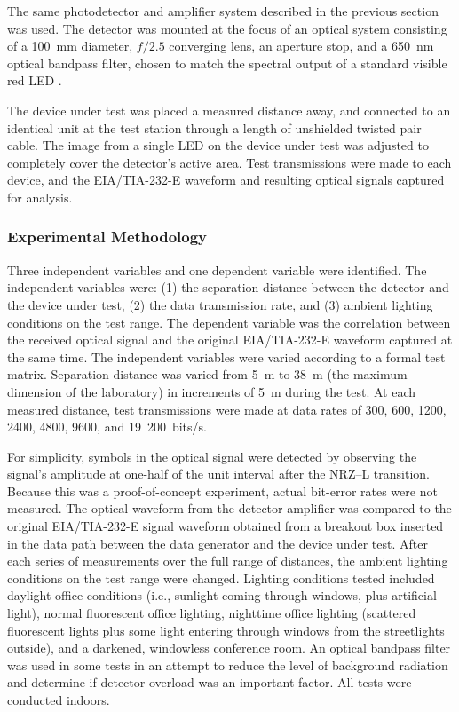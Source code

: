 \documentclass{acmtrans2e}
\begin{document}
The same photodetector and amplifier system described in the previous 
section was used.  The detector was mounted at the 
focus of an optical system consisting of a 100~mm diameter, $f/2.5$ 
converging lens, an aperture stop, and a 650~nm optical bandpass filter, 
chosen to match the spectral output of a standard visible red 
LED \cite{agilent_led_data_sheet}.

The device under test was placed a measured distance away, and connected 
to an identical unit at the test station through a length of unshielded 
twisted pair cable.  The image from a single LED on the 
device under test was adjusted to completely cover the detector's active 
area.  Test transmissions were made to each device, and the
EIA/TIA-232-E waveform and resulting optical signals captured for
analysis.

\subsubsection{Experimental Methodology}

Three independent variables and one dependent variable were identified. 
The independent variables were: (1) the separation distance between the 
detector and the device under test, (2) the data transmission rate, and 
(3) ambient lighting conditions on the test range.  The dependent 
variable was the correlation between the received optical signal and the 
original EIA/TIA-232-E waveform captured at the same time.  The 
independent variables were varied according to a formal test matrix.  
Separation distance was varied from 5~m to 38~m (the maximum 
dimension of the laboratory) in increments of 5~m during the test.  
At each measured distance, test transmissions were made at data rates of 
300, 600, 1200, 2400, 4800, 9600, and 19~200~bits/s.

For simplicity, symbols in the optical signal were detected by observing
the signal's amplitude at one-half of the unit interval after the NRZ--L
transition.  Because this was a proof-of-concept experiment, actual
bit-error rates were not measured.  The optical
waveform from the detector amplifier was compared to the original
EIA/TIA-232-E signal waveform obtained from a breakout box 
inserted in the data path between the data generator and the device 
under test.  After each series of measurements over the full range of 
distances, the ambient lighting conditions on the test range were 
changed.  Lighting conditions tested included daylight office conditions 
(i.e., sunlight coming through windows, plus artificial light), normal
fluorescent office lighting, nighttime office lighting (scattered 
fluorescent lights plus some light entering through windows from the 
streetlights outside), and a darkened, windowless conference room.
An optical bandpass filter was used in some tests in an attempt to 
reduce the level of background radiation and determine if detector 
overload was an important factor.  All tests were conducted indoors.
\end{document}
